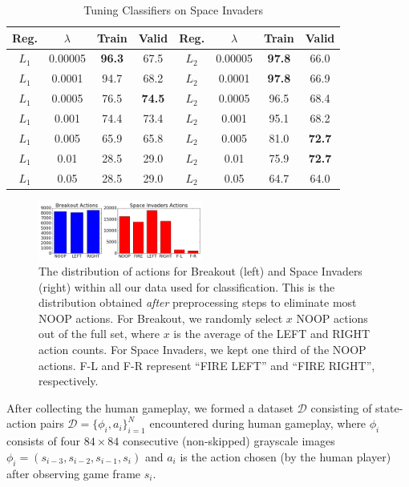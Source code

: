 \documentclass[letterpaper, 10pt, conference]{ieeeconf}
\begin{document}
\begin{table}[!t]
\renewcommand{\arraystretch}{1.3}
\caption{Tuning Classifiers on Space Invaders}
\label{tab:space_invaders}
\centering
\begin{tabular}{c c c c | c c c c}
\hline
Reg.  & $\lambda$ & Train & Valid & Reg.  & $\lambda$ & Train & Valid \\
\hline
$L_1$ & 0.00005   & \textbf{96.3}  & 67.5  & $L_2$ & 0.00005   & \textbf{97.8}  & 66.0 \\
$L_1$ & 0.0001    & 94.7  & 68.2  & $L_2$ & 0.0001    & \textbf{97.8}  & 66.9 \\
$L_1$ & 0.0005    & 76.5  & \textbf{74.5}  & $L_2$ & 0.0005    & 96.5  & 68.4 \\
$L_1$ & 0.001     & 74.4  & 73.4  & $L_2$ & 0.001     & 95.1  & 68.2 \\
$L_1$ & 0.005     & 65.9  & 65.8  & $L_2$ & 0.005     & 81.0  & \textbf{72.7} \\
$L_1$ & 0.01      & 28.5  & 29.0  & $L_2$ & 0.01      & 75.9  & \textbf{72.7} \\
$L_1$ & 0.05      & 28.5  & 29.0  & $L_2$ & 0.05      & 64.7  & 64.0 \\
\hline
\end{tabular}
\end{table}

\begin{figure}[t]
\centering
\includegraphics[width=0.48\textwidth]{figures/bar_charts_actions.png}
\caption{\footnotesize
The distribution of actions for Breakout (left) and Space Invaders (right)
within all our data used for classification. This is the distribution obtained
\emph{after} preprocessing steps to eliminate most NOOP actions. For Breakout,
we randomly select $x$ NOOP actions out of the full set, where $x$ is the
average of the LEFT and RIGHT action counts. For Space Invaders, we kept one
third of the NOOP actions. F-L and F-R represent ``FIRE LEFT'' and ``FIRE
RIGHT'', respectively.
}
\label{fig:action_distribution}
\end{figure}

After collecting the human gameplay, we formed a dataset $\mathcal{D}$
consisting of state-action pairs $\mathcal{D}=\{\phi_i, a_i\}_{i=1}^N$
encountered during human gameplay, where $\phi_i$ consists of four $84\times 84$
consecutive (non-skipped) grayscale images $\phi_i =
(s_{i-3},s_{i-2},s_{i-1},s_i)$ and $a_i$ is the action chosen (by the human
player) after observing game frame $s_i$.
\end{document}
